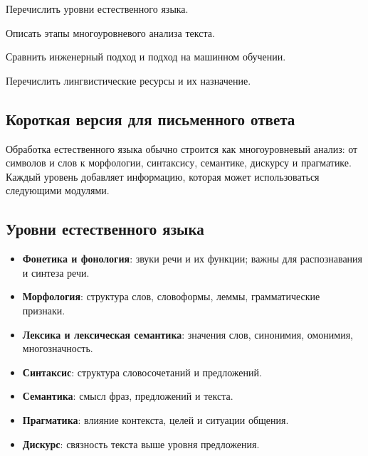 
\begin{examplan}
    \item Перечислить уровни естественного языка.
    \item Описать этапы многоуровневого анализа текста.
    \item Сравнить инженерный подход и подход на машинном обучении.
    \item Перечислить лингвистические ресурсы и их назначение.
\end{examplan}

\subsection*{Короткая версия для письменного ответа}

Обработка естественного языка обычно строится как многоуровневый анализ: от символов и слов к морфологии, синтаксису, семантике, дискурсу и прагматике. Каждый уровень добавляет информацию, которая может использоваться следующими модулями.

\subsection*{Уровни естественного языка}

\begin{itemize}
    \item \textbf{Фонетика и фонология}: звуки речи и их функции; важны для распознавания и синтеза речи.
    \item \textbf{Морфология}: структура слов, словоформы, леммы, грамматические признаки.
    \item \textbf{Лексика и лексическая семантика}: значения слов, синонимия, омонимия, многозначность.
    \item \textbf{Синтаксис}: структура словосочетаний и предложений.
    \item \textbf{Семантика}: смысл фраз, предложений и текста.
    \item \textbf{Прагматика}: влияние контекста, целей и ситуации общения.
    \item \textbf{Дискурс}: связность текста выше уровня предложения.
\end{itemize}


